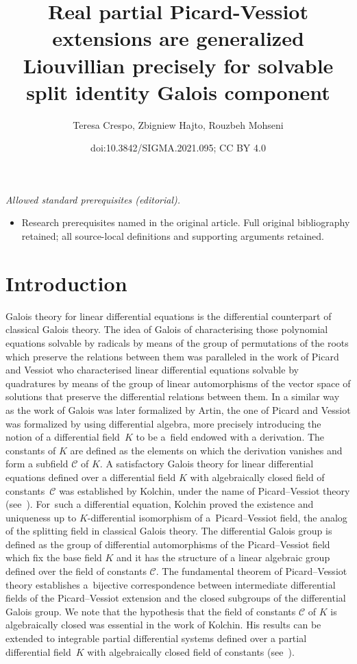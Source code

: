 \documentclass[10pt,a4paper]{amsart}
\title{Real partial Picard-Vessiot extensions are generalized Liouvillian precisely for solvable split identity Galois component}
\author{Teresa Crespo, Zbigniew Hajto, Rouzbeh Mohseni}
\date{doi:10.3842/SIGMA.2021.095; CC BY 4.0}
\numberwithin{equation}{section}
\begin{document}
\maketitle
\noindent\textit{Allowed standard prerequisites (editorial).}\begin{itemize}
\item Research prerequisites named in the original article. Full original bibliography retained; all source-local definitions and supporting arguments retained.
\end{itemize}\medskip
\section{Introduction}
Galois theory for linear differential equations is the differential counterpart of classical Galois theory. The idea of Galois of characterising those polynomial equations solvable by radicals by means of the group of permutations of the roots which preserve the relations between them was paralleled in the work of Picard and Vessiot who characterised linear differential equations solvable by quadratures by means of the group of linear automorphisms of the vector space of solutions that preserve the differential relations between them. In a similar way as the work of Galois was later forma\-li\-zed by Artin, the one of Picard and Vessiot was forma\-li\-zed by using differential algebra, more precisely introducing the notion of a differential field~$K$ to be a~field endowed with a derivation. The constants of $K$ are defined as the elements on which the derivation vanishes and form a subfield $\mathcal{C}$ of $K$. A satisfactory Galois theory for linear differential equations defined over a differential field $K$ with algebraically closed field of constants~$\mathcal{C}$ was established by Kolchin, under the name of Picard--Vessiot theory (see~\cite{Kol0}). For~such a differential equation, Kolchin proved the existence and uniqueness up to $K$-differential isomorphism of a~Picard--Vessiot field, the analog of the splitting field in classical Galois theo\-ry. The differential Galois group is defined as the group of differential automorphisms of the Picard--Vessiot field which fix the base field $K$ and it has the structure of a linear algebraic group defined over the field of constants $\mathcal{C}$. The fundamental theorem of Picard--Vessiot theory establishes a~bijective correspondence between intermediate differential fields of the Picard--Vessiot extension and the closed subgroups of the differential Galois group. We note that the hypothesis that the field of constants $\mathcal{C}$ of $K$ is algebraically closed was essential in the work of Kolchin. His results can be extended to integrable partial differential systems defined over a partial differential field~$K$ with algebraically closed field of constants (see~\cite[Appendix~D]{PS}).
\end{document}
